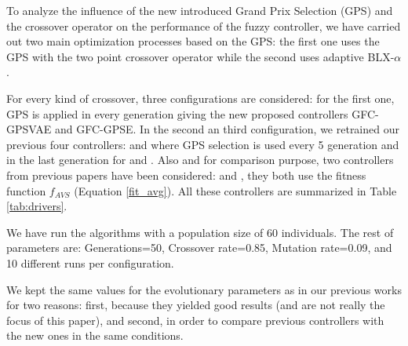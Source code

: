 \documentclass[10pt,journal,compsoc]{IEEEtran}
\begin{document}

To analyze the influence of the new introduced Grand Prix Selection
(GPS) and the crossover operator on the performance of the fuzzy
controller, we have carried out  two main optimization processes based
on the GPS: the first one uses the GPS with the two point crossover
operator while the second uses adaptive BLX-$\alpha$.

For every kind of crossover, three configurations are considered: for
the first one, GPS is applied in every generation giving the new
proposed controllers {\sf GFC-GPSVAE} and {\sf GFC-GPSE}. 
In the second an third configuration, we retrained our previous four  controllers\cite{DBLP:conf/cig/SalemMG19}: {} and 
{} where GPS selection is used every 5 generation and in the last generation for  {} and {}.
Also and for comparison purpose, two controllers from previous papers have been considered: {}\cite{DBLP:conf/cig/SalemMG19} and {}\cite{salem_cig2018}, they both use the fitness function $f_{AVS}$ (Equation \ref{fit_avg}).
All these controllers are summarized in Table \ref{tab:drivers}. 

We have run the algorithms with a population size of 60
individuals. The rest of parameters are: Generations=50, Crossover
rate=0.85, Mutation rate=0.09, and 10 different runs per
configuration. %

We kept the same values for the evolutionary parameters as in our previous works for two reasons: first, because they yielded good results (and are not really the focus of this paper), and second, in order to compare previous controllers with the new ones in the same conditions.
\end{document}

